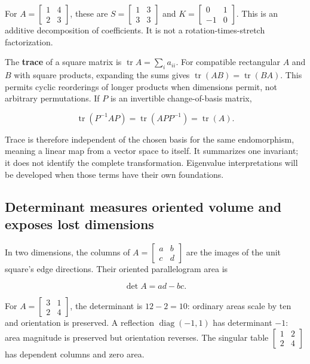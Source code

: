 For \(A=\begin{bmatrix}1&4\\2&3\end{bmatrix}\), these are \(S=\begin{bmatrix}1&3\\3&3\end{bmatrix}\) and \(K=\begin{bmatrix}0&1\\-1&0\end{bmatrix}\). This is an additive decomposition of coefficients. It is not a rotation-times-stretch factorization.

The \textbf{trace} of a square matrix is \(\operatorname{tr}A=\sum_i a_{ii}\). For compatible rectangular \(A\) and \(B\) with square products, expanding the sums gives \(\operatorname{tr}(AB)=\operatorname{tr}(BA)\). This permits cyclic reorderings of longer products when dimensions permit, not arbitrary permutations. If \(P\) is an invertible change-of-basis matrix,

\[
\operatorname{tr}(P^{-1}AP)=\operatorname{tr}(APP^{-1})=\operatorname{tr}(A).
\]

Trace is therefore independent of the chosen basis for the same endomorphism, meaning a linear map from a vector space to itself. It summarizes one invariant; it does not identify the complete transformation. Eigenvalue interpretations will be developed when those terms have their own foundations.

\subsection{Determinant measures oriented volume and exposes lost dimensions}\label{01-foundations-i-ch018-determinant-measures-oriented-volume-and-exposes-lost-dimensions}

In two dimensions, the columns of \(A=\begin{bmatrix}a&b\\c&d\end{bmatrix}\) are the images of the unit square's edge directions. Their oriented parallelogram area is

\[
\det A=ad-bc.
\]

For \(A=\begin{bmatrix}3&1\\2&4\end{bmatrix}\), the determinant is \(12-2=10\): ordinary areas scale by ten and orientation is preserved. A reflection \(\operatorname{diag}(-1,1)\) has determinant \(-1\): area magnitude is preserved but orientation reverses. The singular table \(\begin{bmatrix}1&2\\2&4\end{bmatrix}\) has dependent columns and zero area.

